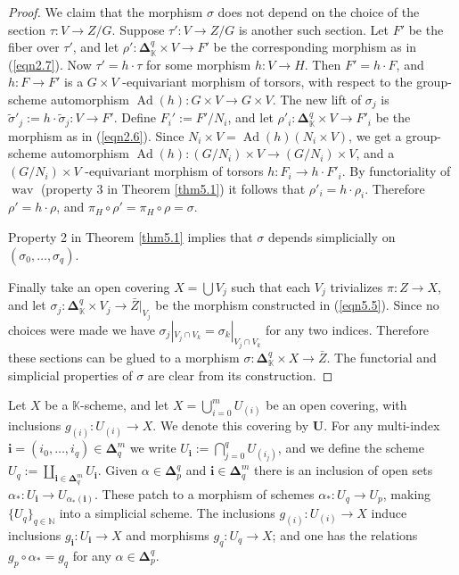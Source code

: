 \documentclass[10pt]{amsart}
\theoremstyle{definition}
\numberwithin{equation}{section}
\newcommand{\opn}{\operatorname}
\newcommand{\mbb}[1]{\mathbb{#1}}
\newcommand{\bsym}[1]{\boldsymbol{#1}}
\newcommand{\til}[1]{\tilde{#1}}
\newcommand{\K}{\mbb{K}}
\begin{document}
\begin{proof}
We claim that the morphism $\sigma$ does not depend 
on the choice of the section $\tau : V \to Z / G$. 
Suppose $\tau' : V \to Z / G$ is another such section.
Let $F'$ be the fiber over $\tau'$, and let
$\rho' : \bsym{\Delta}^q_{\K} \times V \to F'$
be the corresponding morphism as in (\ref{eqn2.7}). Now
$\tau' = h \cdot \tau$ for some morphism $h : V \to H$. 
Then $F' = h \cdot F$, and $h : F \to F'$ is a $G \times V$
-equivariant morphism of torsors, 
with respect to the group-scheme automorphism
$\opn{Ad}(h) : G \times V \to G \times V$. 
The new lift of $\sigma_j$ is 
$\til{\sigma}'_j := h \cdot \til{\sigma}_j : V \to F'$.
Define $F_i' := F' / N_i$,
and let $\rho'_i : \bsym{\Delta}^q_{\K} \times V \to F'_i$
be the morphism as in (\ref{eqn2.6}). 
Since $N_i \times V = \opn{Ad}(h)(N_i \times V)$,
we get a group-scheme automorphism
$\opn{Ad}(h) : (G/N_i) \times V \to (G/N_i) \times V$,
and a $(G/N_i) \times V$ -equivariant morphism of 
torsors $h : F_i \to h \cdot F'_i$. 
By functoriality of $\opn{wav}$ (property 3 in Theorem \ref{thm5.1})
it follows that $\rho'_i = h \cdot \rho_i$. Therefore 
$\rho' = h \cdot \rho$, and
$\pi_{H} \circ \rho' = \pi_{H} \circ \rho = \sigma$. 

Property 2 in Theorem \ref{thm5.1}
implies that $\sigma$ depends 
simplicially on $(\sigma_0, \ldots, \sigma_q)$.

Finally take an open covering $X = \bigcup V_j$ such that each 
$V_j$ trivializes $\pi : Z \to X$, and let
$\sigma_j : \bsym{\Delta}^q_{\K} \times V_j \to \bar{Z}|_{V_j}$ 
be the morphism constructed in 
(\ref{eqn5.5}). Since no choices were made we have
$\sigma_j|_{V_j \cap V_k} = \sigma_k|_{V_j \cap V_k}$
for any two indices. Therefore these sections can be glued to a 
morphism 
$\sigma : \bsym{\Delta}^q_{\K} \times X \to \bar{Z}$. 
The functorial and simplicial 
properties of $\sigma$ are clear from its construction.
\end{proof}

Let $X$ be a $\K$-scheme, and let
$X = \bigcup_{i = 0}^m U_{(i)}$ be an open covering, with 
inclusions $g_{(i)} : U_{(i)} \to X$. We denote this covering by 
$\bsym{U}$. For any multi-index
$\bsym{i} = (i_0, \ldots, i_q) \in \bsym{\Delta}^m_q$
we write $U_{\bsym{i}} := \bigcap_{j = 0}^q U_{(i_j)}$,
and we define the scheme
$U_{q} := \coprod_{\bsym{i} \in \bsym{\Delta}^m_q}
U_{\bsym{i}}.$
Given $\alpha \in \bsym{\Delta}_p^q$ and 
$\bsym{i} \in \bsym{\Delta}^m_q$ there is an inclusion of open 
sets
$\alpha_* : U_{\bsym{i}} \to U_{\alpha_*(\bsym{i})}$. 
These patch to a morphism of schemes
$\alpha_* : U_q \to U_p$,
making $\{ U_q \}_{q \in \mbb{N}}$ into a simplicial 
scheme. The inclusions $g_{(i)} : U_{(i)} \to X$ induce inclusions
$g_{\bsym{i}} : U_{\bsym{i}} \to X$
and morphisms 
$g_q : U_q \to X$; and one has the relations
$g_p \circ \alpha_* = g_q$
for any $\alpha \in \bsym{\Delta}_p^q$.
\end{document}
